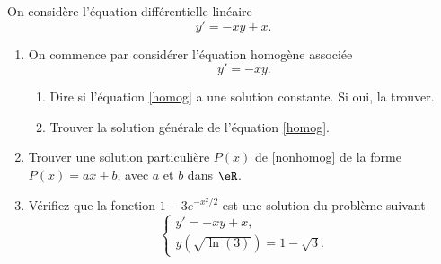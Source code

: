 \begin{exercice}\label{exoExamen-0005}

On considère l'équation différentielle linéaire 
\begin{equation}\label{nonhomog}
  y'=-xy+x.
\end{equation}
\begin{enumerate}
\item On commence par considérer l'équation homogène associée
  \begin{equation}\label{homog}
    y'=-xy.
  \end{equation}
  \begin{enumerate}
  \item Dire si l'équation \eqref{homog} a une solution constante. Si oui, la trouver. 
  \item Trouver la solution générale de l'équation \eqref{homog}.
  \end{enumerate}
\item  Trouver  une solution particulière $P(x)$ de \eqref{nonhomog} de la forme $P(x)=ax+b$, avec $a$ et $b$ dans $\eR$. 
\item Vérifiez que la fonction $1-3e^{-x^2/2}$ est une solution du problème suivant
  \begin{equation}
    \left\{\begin{array}{l}
      y'=-xy+x,\\
      y(\sqrt{\ln(3)})= 1-\sqrt{3}.
    \end{array}\right.
  \end{equation}
\end{enumerate}

\end{exercice}
